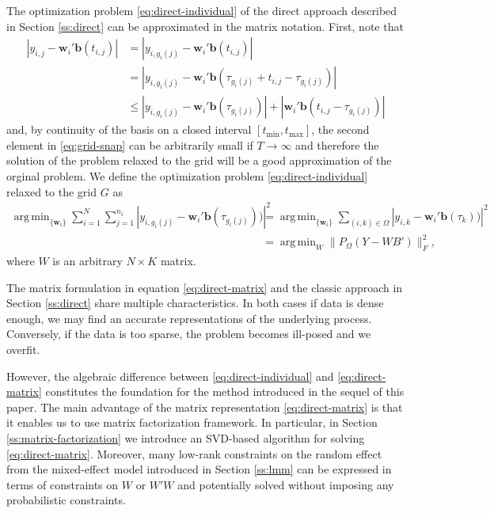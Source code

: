 \documentclass[preprint]{imsart}
\numberwithin{equation}{section}
\theoremstyle{plain}
\newcommand{\bb}{\mathbf{b}}
\newcommand{\bw}{\mathbf{w}}
\DeclareMathOperator*{\argmin}{arg\,min}
\begin{document}
The optimization problem \eqref{eq:direct-individual} of the direct approach described in Section \ref{ss:direct} can be approximated in the matrix notation. First, note that
\begin{align}
  \left|y_{i,j} - \bw_i'\bb(t_{i,j})\right| &= \left|y_{i,g_i(j)} - \bw_i'\bb(t_{i,j})\right|\nonumber\\
  &= \left| y_{i,g_i(j)} - \bw_i' \bb(\tau_{g_i(j)} + t_{i,j} - \tau_{g_i(j)})\right|\nonumber\\
  &\leq \left| y_{i,g_i(j)} - \bw_i' \bb(\tau_{g_i(j)})\right| + \left|\bw_i' \bb(t_{i,j} - \tau_{g_i(j)})\right|\label{eq:grid-snap}
\end{align}
and, by continuity of the basis on a closed interval $[t_{\min},t_{\max}]$, the second element in \eqref{eq:grid-snap} can be arbitrarily small if $T \rightarrow \infty$ and therefore the solution of the problem relaxed to the grid will be a good approximation of the orginal problem. We define the optimization problem \eqref{eq:direct-individual} relaxed to the grid $G$ as
\begin{align}
 \argmin_{\{\bw_i\}}\sum_{i=1}^N \sum_{j=1}^{n_i}\left|y_{i,g_i(j)} - \bw_i' \bb(\tau_{g_i(j)}))\right|^2 &= \argmin_{\{\bw_i\}}\sum_{(i,k) \in \Omega}\left|y_{i,k} - \bw_i' \bb(\tau_{k}))\right|^2\nonumber\\
&= \argmin_W \| P_\Omega(Y - WB') \|_F^2,\label{eq:direct-matrix}
\end{align}
where $W$ is an arbitrary $N \times K$ matrix.

The matrix formulation in equation \eqref{eq:direct-matrix} and the classic approach in Section \ref{ss:direct} share multiple characteristics. In both cases if data is dense enough, we may find an accurate representations of the underlying process. Conversely, if the data is too sparse, the problem becomes ill-posed and we overfit.

However, the algebraic difference between \eqref{eq:direct-individual} and \eqref{eq:direct-matrix} constitutes the foundation for the method introduced in the sequel of this paper. The main advantage of the matrix representation \eqref{eq:direct-matrix} is that it enables us to use matrix factorization framework. In particular, in Section \ref{ss:matrix-factorization} we introduce an SVD-based algorithm for solving \eqref{eq:direct-matrix}. Moreover, many low-rank constraints on the random effect from the mixed-effect model introduced in Section \ref{ss:lmm} can be expressed in terms of constraints on $W$ or $W'W$ and potentially solved without imposing any probabilistic constraints.
\end{document}
